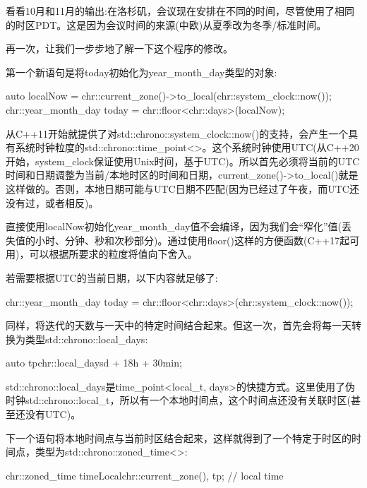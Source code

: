 看看10月和11月的输出:在洛杉矶，会议现在安排在不同的时间，尽管使用了相同的时区PDT。这是因为会议时间的来源(中欧)从夏季改为冬季/标准时间。

再一次，让我们一步步地了解一下这个程序的修改。


第一个新语句是将today初始化为year\_month\_day类型的对象:

\begin{cpp}
auto localNow = chr::current_zone()->to_local(chr::system_clock::now());
chr::year_month_day today = chr::floor<chr::days>(localNow);
\end{cpp}

从C++11开始就提供了对std::chrono::system\_clock::now()的支持，会产生一个具有系统时钟粒度的std::chrono::time\_point<>。这个系统时钟使用UTC(从C++20开始，system\_clock保证使用Unix时间，基于UTC)。所以首先必须将当前的UTC时间和日期调整为当前/本地时区的时间和日期，current\_zone()->to\_local()就是这样做的。否则，本地日期可能与UTC日期不匹配(因为已经过了午夜，而UTC还没有过，或者相反)。

直接使用localNow初始化year\_month\_day值不会编译，因为我们会“窄化”值(丢失值的小时、分钟、秒和次秒部分)。通过使用floor()这样的方便函数(C++17起可用)，可以根据所要求的粒度将值向下舍入。

若需要根据UTC的当前日期，以下内容就足够了:

\begin{cpp}
chr::year_month_day today = chr::floor<chr::days>(chr::system_clock::now());
\end{cpp}


同样，将迭代的天数与一天中的特定时间结合起来。但这一次，首先会将每一天转换为类型std::chrono::local\_days:

\begin{cpp}
auto tp{chr::local_days{d} + 18h + 30min};
\end{cpp}

std::chrono::local\_days是time\_point<local\_t, days>的快捷方式。这里使用了伪时钟std::chrono::local\_t，所以有一个本地时间点，这个时间点还没有关联时区(甚至还没有UTC)。

下一个语句将本地时间点与当前时区结合起来，这样就得到了一个特定于时区的时间点，类型为std::chrono::zoned\_time<>:

\begin{cpp}
chr::zoned_time timeLocal{chr::current_zone(), tp}; // local time
\end{cpp}

